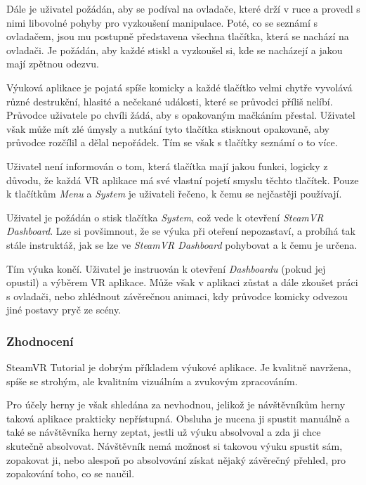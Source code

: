 Dále je uživatel požádán, aby se podíval na ovladače, které drží v ruce
a provedl s nimi libovolné pohyby pro vyzkoušení manipulace.
Poté, co se seznámí s ovladačem, jsou mu postupně představena
všechna tlačítka, která se nachází na ovladači. Je požádán, aby každé
stiskl a vyzkoušel si, kde se nacházejí a jakou mají zpětnou odezvu.

Výuková aplikace je pojatá spíše komicky a každé tlačítko velmi chytře
vyvolává různé destrukční, hlasité a nečekané události, které se
průvodci příliš nelíbí. Průvodce uživatele po chvíli žádá, aby s opakovaným
mačkáním přestal. Uživatel však může mít zlé úmysly a nutkání tyto tlačítka
stisknout opakovaně, aby průvodce rozčílil a dělal nepořádek. Tím se
však s tlačítky seznámí o to více.

Uživatel není informován o tom, která tlačítka mají jakou funkci, logicky z
důvodu, že každá VR aplikace má své vlastní pojetí smyslu těchto
tlačítek. Pouze k tlačítkům \emph{Menu} a \emph{System} je uživateli
řečeno, k čemu se nejčastěji používají.

Uživatel je požádán o stisk tlačítka \emph{System}, což vede k otevření
\emph{SteamVR Dashboard}. Lze si povšimnout, že se výuka při oteření
nepozastaví, a probíhá tak stále instruktáž, jak se lze ve \emph{SteamVR
Dashboard} pohybovat a k čemu je určena.

Tím výuka končí. Uživatel je instruován k otevření
\emph{Dashboardu} (pokud jej opustil) a výběrem VR aplikace. Může však v
aplikaci zůstat a dále zkoušet práci s ovladači, nebo zhlédnout
závěrečnou animaci, kdy průvodce komicky odvezou jiné postavy pryč ze
scény.

\subsubsection{Zhodnocení}\label{zhodnocenuxed}

SteamVR Tutorial je dobrým příkladem výukové aplikace. Je kvalitně
navržena, spíše se strohým, ale kvalitním vizuálním a zvukovým
zpracováním.

Pro účely herny je však shledána za nevhodnou, jelikož je návštěvníkům herny
taková aplikace prakticky nepřístupná. Obsluha je nucena ji spustit
manuálně a také se návštěvníka herny zeptat, jestli už výuku absolvoval
a zda ji chce skutečně absolvovat. Návštěvník nemá možnost si takovou
výuku spustit sám, zopakovat ji, nebo alespoň po absolvování získat
nějaký závěrečný přehled, pro zopakování toho, co se naučil.

